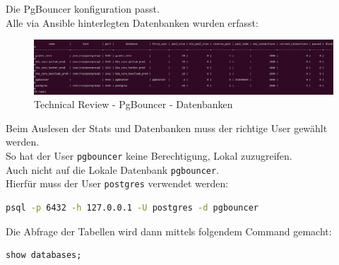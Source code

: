 \begin{flushleft}
    Die PgBouncer konfiguration passt.\\
    Alle via \Gls{Ansible} hinterlegten Datenbanken wurden erfasst:
    \begin{figure}[H]
        \centering
        \includegraphics[width=1\linewidth]{source/implementation/construction_implementation/technical_review/pgbouncer_databases}
        \caption{Technical Review - PgBouncer - Datenbanken}
        \label{fig:pgbouncer_databases}
    \end{figure}
    Beim Auslesen der Stats und Datenbanken muss der richtige User gewählt werden.\\
    So hat der User \texttt{pgbouncer} keine Berechtigung, Lokal zuzugreifen.\\
    Auch nicht auf die Lokale Datenbank \texttt{pgbouncer}.\\
    Hierfür muss der User \texttt{postgres} verwendet werden:
\lstset{style=gra_codestyle}
\begin{lstlisting}[language=bash, caption=PgBouncer - Connect,captionpos=b,label={lst:pgbouncer_connect},breaklines=true]
psql -p 6432 -h 127.0.0.1 -U postgres -d pgbouncer
\end{lstlisting}
    Die Abfrage der Tabellen wird dann mittels folgendem Command gemacht:
\lstset{style=gra_codestyle}
\begin{lstlisting}[language=sql, caption=PgBouncer - Databases,captionpos=b,label={lst:pgbouncer_list_databases},breaklines=true]
show databases;
\end{lstlisting}
\end{flushleft}